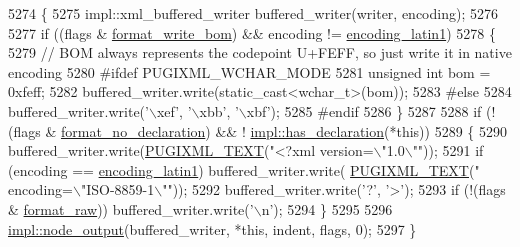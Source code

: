 \begin{DoxyCode}
5274     \{
5275         impl::xml\_buffered\_writer buffered\_writer(writer, encoding);
5276 
5277         \textcolor{keywordflow}{if} ((flags & \hyperlink{namespacepugi_ab863bcafd203aeaa98953df3a998243f}{format\_write\_bom}) && encoding != 
      \hyperlink{namespacepugi_a03f708f86abeff5fce6842ffd6a0951ea9f1a8dbbf996bcd297ce0922b7eec40d}{encoding\_latin1})
5278         \{
5279             \textcolor{comment}{// BOM always represents the codepoint U+FEFF, so just write it in native encoding}
5280 \textcolor{preprocessor}{        #ifdef PUGIXML\_WCHAR\_MODE}
5281 \textcolor{preprocessor}{}            \textcolor{keywordtype}{unsigned} \textcolor{keywordtype}{int} bom = 0xfeff;
5282             buffered\_writer.write(static\_cast<wchar\_t>(bom));
5283 \textcolor{preprocessor}{        #else}
5284 \textcolor{preprocessor}{}            buffered\_writer.write(\textcolor{stringliteral}{'\(\backslash\)xef'}, \textcolor{stringliteral}{'\(\backslash\)xbb'}, \textcolor{stringliteral}{'\(\backslash\)xbf'});
5285 \textcolor{preprocessor}{        #endif}
5286 \textcolor{preprocessor}{}        \}
5287 
5288         \textcolor{keywordflow}{if} (!(flags & \hyperlink{namespacepugi_a0ec33e4db09260718f7003ed091f5a1b}{format\_no\_declaration}) && !
      \hyperlink{pugixml_8cpp_a51b27832195cf2345f65119f07056743}{impl::has\_declaration}(*\textcolor{keyword}{this}))
5289         \{
5290             buffered\_writer.write(\hyperlink{pugixml_8hpp_ad5475bca2e336810ae5906349e644d0b}{PUGIXML\_TEXT}(\textcolor{stringliteral}{"<?xml version=\(\backslash\)"1.0\(\backslash\)""}));
5291             \textcolor{keywordflow}{if} (encoding == \hyperlink{namespacepugi_a03f708f86abeff5fce6842ffd6a0951ea9f1a8dbbf996bcd297ce0922b7eec40d}{encoding\_latin1}) buffered\_writer.write(
      \hyperlink{pugixml_8hpp_ad5475bca2e336810ae5906349e644d0b}{PUGIXML\_TEXT}(\textcolor{stringliteral}{" encoding=\(\backslash\)"ISO-8859-1\(\backslash\)""}));
5292             buffered\_writer.write(\textcolor{charliteral}{'?'}, \textcolor{charliteral}{'>'});
5293             \textcolor{keywordflow}{if} (!(flags & \hyperlink{namespacepugi_a2dd811716b1c0a6a2431ceca43bc649e}{format\_raw})) buffered\_writer.write(\textcolor{charliteral}{'\(\backslash\)n'});
5294         \}
5295 
5296         \hyperlink{pugixml_8cpp_a7f5dd565c9321db184119a5f337333e7}{impl::node\_output}(buffered\_writer, *\textcolor{keyword}{this}, indent, flags, 0);
5297     \}
\end{DoxyCode}
